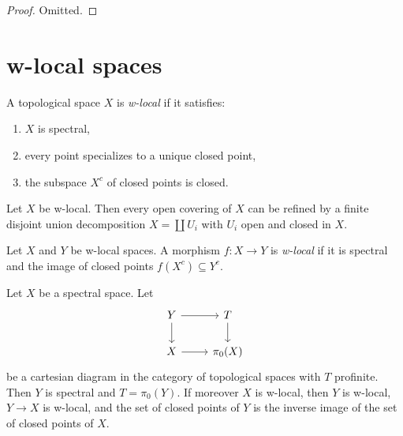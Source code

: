 \begin{proof}
  Omitted.
\end{proof}

\section{w-local spaces}

\begin{definition}
    \label{def:w-local-space}
    \leanok
    A topological space \(X\) is \emph{w-local} if it satisfies:
    \begin{enumerate}
        \item \(X\) is spectral,
        \item every point specializes to a unique closed point,
        \item the subspace \(X^c\) of closed points is closed.
    \end{enumerate}
\end{definition}

\begin{lemma}
    Let $X$ be w-local. Then every open covering of $X$ can be refined
    by a finite disjoint union decomposition $X = \coprod U_i$ with $U_i$ open and closed in $X$.
\end{lemma}

\begin{definition}
    Let \(X\) and \(Y\) be w-local spaces. A morphism \(f: X \to Y\) is \emph{w-local} if it is spectral and the image of closed points \(f(X^c) \subseteq Y^c\).
    \label{def:w-local-space-map}
    \leanok
\end{definition}

\begin{lemma}
Let $X$ be a spectral space. Let
\[
\begin{tikzcd}
Y \arrow[r] \arrow[d] & T \arrow[d] \\
X \arrow[r] & \pi_0(X)
\end{tikzcd}
\]
be a cartesian diagram in the category of topological spaces with $T$ profinite. Then $Y$ is spectral and $T = \pi_0(Y)$. If moreover $X$ is w-local, then $Y$ is w-local, $Y \to X$ is w-local, and the set of closed points of $Y$ is the inverse image of the set of closed points of $X$.
\label{thm:cartesian-w-local}
\end{lemma}


